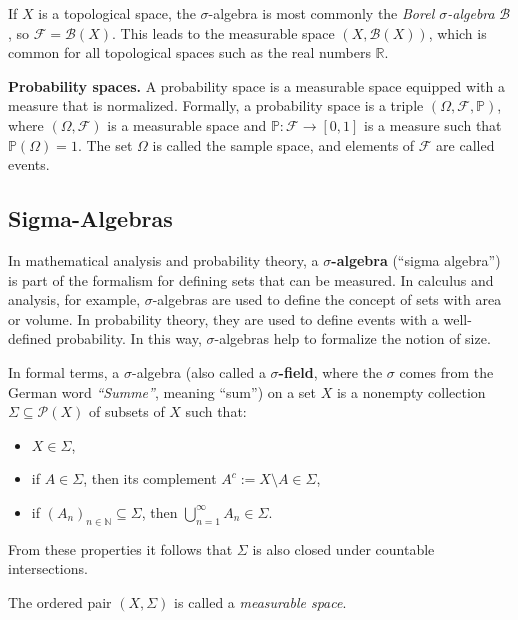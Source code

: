 \par
If $X$ is a topological space, the $\sigma$-algebra is most commonly the \textit{Borel $\sigma$-algebra} $\mathcal{B}$, so $\mathcal{F} = \mathcal{B}(X)$. This leads to the measurable space $(X, \mathcal{B}(X))$, which is common for all topological spaces such as the real numbers $\mathbb{R}$.

\par
\textbf{Probability spaces.}  
A probability space is a measurable space equipped with a measure that is normalized. Formally, a probability space is a triple $(\Omega, \mathcal{F}, \mathbb{P})$, where $(\Omega, \mathcal{F})$ is a measurable space and $\mathbb{P} : \mathcal{F} \to [0,1]$ is a measure such that $\mathbb{P}(\Omega) = 1$. The set $\Omega$ is called the sample space, and elements of $\mathcal{F}$ are called events.
\subsection{Sigma-Algebras}

In mathematical analysis and probability theory, a \textbf{$\sigma$-algebra} (``sigma algebra'') is part of the formalism for defining sets that can be measured. In calculus and analysis, for example, $\sigma$-algebras are used to define the concept of sets with area or volume. In probability theory, they are used to define events with a well-defined probability. In this way, $\sigma$-algebras help to formalize the notion of size.

\par
In formal terms, a $\sigma$-algebra (also called a \textbf{$\sigma$-field}, where the $\sigma$ comes from the German word \textit{``Summe''}, meaning ``sum'') on a set $X$ is a nonempty collection $\Sigma \subseteq \mathcal{P}(X)$ of subsets of $X$ such that:
\begin{itemize}
    \item $X \in \Sigma$,
    \item if $A \in \Sigma$, then its complement $A^c := X \setminus A \in \Sigma$,
    \item if $(A_n)_{n \in \mathbb{N}} \subseteq \Sigma$, then $\bigcup_{n=1}^{\infty} A_n \in \Sigma$.
\end{itemize}
From these properties it follows that $\Sigma$ is also closed under countable intersections.

\par
The ordered pair $(X, \Sigma)$ is called a \textit{measurable space}.

